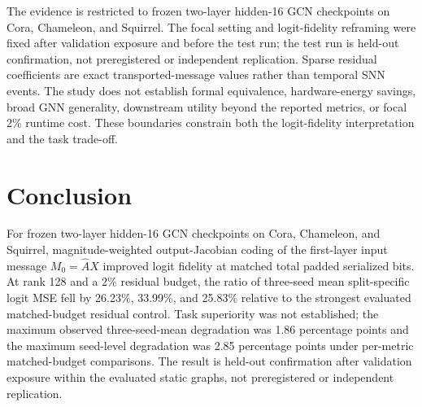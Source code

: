 \documentclass{article}
\begin{document}
The evidence is restricted to frozen two-layer hidden-16 GCN checkpoints on Cora, Chameleon, and Squirrel. The focal setting and logit-fidelity reframing were fixed after validation exposure and before the test run; the test run is held-out confirmation, not preregistered or independent replication. Sparse residual coefficients are exact transported-message values rather than temporal SNN events. The study does not establish formal equivalence, hardware-energy savings, broad GNN generality, downstream utility beyond the reported metrics, or focal 2\% runtime cost. These boundaries constrain both the logit-fidelity interpretation and the task trade-off.

\section{Conclusion}

\label{sec:conclusion}

For frozen two-layer hidden-16 GCN checkpoints on Cora, Chameleon, and Squirrel, magnitude-weighted output-Jacobian coding of the first-layer input message \(M_0=\hat{A}X\) improved logit fidelity at matched total padded serialized bits. At rank 128 and a 2\% residual budget, the ratio of three-seed mean split-specific logit MSE fell by 26.23\%, 33.99\%, and 25.83\% relative to the strongest evaluated matched-budget residual control. Task superiority was not established; the maximum observed three-seed-mean degradation was 1.86 percentage points and the maximum seed-level degradation was 2.85 percentage points under per-metric matched-budget comparisons. The result is held-out confirmation after validation exposure within the evaluated static graphs, not preregistered or independent replication.



\end{document}
